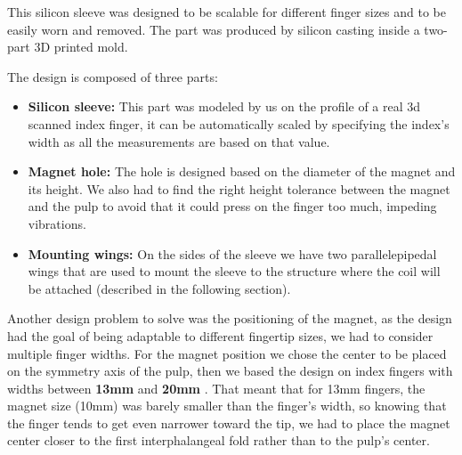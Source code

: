 This silicon sleeve was designed to be scalable for different finger sizes and to be easily worn and removed.
The part was produced by silicon casting inside a two-part 3D printed mold.

The design is composed of three parts:
\begin{itemize}
    \item \textbf{Silicon sleeve: } This part was modeled by us on the profile of a real 3d scanned index finger, it can be automatically scaled by specifying the index's width as all the measurements are based on that value.
    \item \textbf{Magnet hole: } The hole is designed based on the diameter of the magnet and its height. We also had to find the right height tolerance between the magnet and the pulp to avoid that it could press on the finger too much, impeding vibrations.
    \item \textbf{Mounting wings: } On the sides of the sleeve we have two parallelepipedal wings that are used to mount the sleeve to the structure where the coil will be attached (described in the following section). 
\end{itemize}

Another design problem to solve was the positioning of the magnet, as the design had the goal of being adaptable to different fingertip sizes, we had to consider multiple finger widths. 
For the magnet position we chose the center to be placed on the symmetry axis of the pulp, then we based the design on index fingers with widths between \textbf{13mm} and \textbf{20mm} \cite{index_fingers_width}.
That meant that for 13mm fingers, the magnet size (10mm) was barely smaller than the finger's width, so knowing that the finger tends to get even narrower toward the tip, we had to place the magnet center closer to the first interphalangeal fold rather than to the pulp's center.

